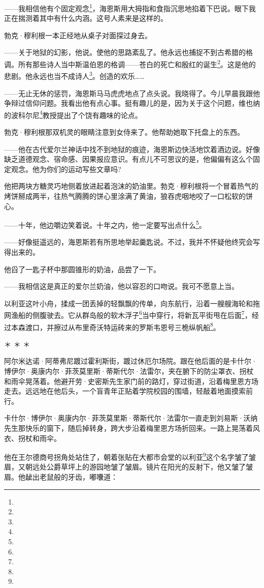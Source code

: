 \par ——我相信他有个固定观念\footnote{}，海恩斯用大拇指和食指沉思地掐着下巴说。眼下我正在揣测着其中有什么内涵。这号人素来是这样的。
\par 勃克·穆利根一本正经地从桌子对面探过身去。
\par ——关于地狱的幻影，他说。使他的思路紊乱了。他永远也捕捉不到古希腊的格调。所有那些诗人当中斯温伯恩的格调——苍白的死亡和殷红的诞生\footnote{}。这是他的悲剧。他永远也当不成诗人\footnote{}。创造的欢乐……
\par ——无止无休的惩罚，海恩斯马马虎虎地点了点头说。我晓得了。今儿早晨我跟他争辩过信仰问题。我看出他有点心事。挺有趣儿的是，因为关于这个问题，维也纳的波科尔尼\footnote{}教授提出了个饶有趣味的论点。
\par 勃克·穆利根那双机灵的眼睛注意到女侍来了。他帮助她取下托盘上的东西。
\par ——他在古代爱尔兰神话中找不到地狱的痕迹，海恩斯边快活地饮着酒边说。好像缺乏道德观念、宿命感、因果报应意识。有点儿不可思议的是，他偏偏有这么个固定观念。他为你们的运动写些文章吗?
\par 他把两块方糖灵巧地侧着放进起着泡沫的奶油里。勃克·穆利根将一个冒着热气的烤饼掰成两半，往热气腾腾的饼心里涂满了黄油，狼吞虎咽地咬了一口松软的饼心。
\par ——十年，他边嚼边笑着说。十年之内，他一定要写出点什么\footnote{}。
\par ——好像挺遥远的，海恩斯若有所思地举起羹匙说。不过，我并不怀疑他终究会写得出来的。
\par 他舀了一匙子杯中那圆锥形的奶油，品尝了一下。
\par ——我相信这是真正的爱尔兰奶油，他以容忍的口吻说。我可不愿意上当。
\par 以利亚这叶小舟，揉成一团丢掉的轻飘飘的传单，向东航行，沿着一艘艘海轮和拖网渔船的侧腹驶去。它从群岛般的软木浮子\footnote{}当中穿行，将新瓦平街甩在后面\footnote{}，经过本森渡口，并擦过从布里奇沃特运砖来的罗斯韦恩号三桅纵帆船\footnote{}。
\par ＊ ＊ ＊
\par 阿尔米达诺·阿蒂弗尼踱过霍利斯街，踱过休厄尔场院。跟在他后面的是卡什尔·博伊尔·奥康内尔·菲茨莫里斯·蒂斯代尔·法雷尔，夹在腑下的防尘罩衣、拐杖和雨伞晃荡着。他避开劳·史密斯先生家门前的路灯，穿过街道，沿着梅里恩方场走去。远远地在他后头，一个盲青年正贴着学院校园的围墙，轻敲着地面摸索前行。
\par 卡什尔·博伊尔·奥康内尔·菲茨莫里斯·蒂斯代尔·法雷尔一直走到刘易斯·沃纳先生那快乐的窗下，随后掉转身，跨大步沿着梅里恩方场折回来。一路上晃荡着风衣、拐杖和雨伞。
\par 他在王尔德商号拐角处站住了，朝着张贴在大都市会堂的以利亚\footnote{}这个名字皱了皱眉，又朝远处公爵草坪上的游园地皱了皱眉。镜片在阳光的反射下，他又皱了皱眉。他龇出老鼠般的牙齿，嘟囔道：
